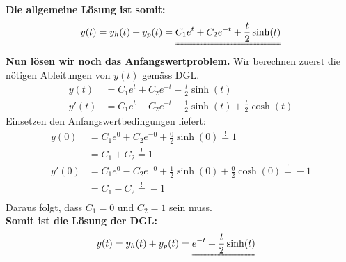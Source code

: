 \textbf{Die allgemeine Lösung ist somit:}
\[
	y(t) = y_h(t) + y_p(t) = \uuline{C_1 e^t + C_2 e^{-t} + \frac{t}{2} \sinh(t)}
\]
\textbf{Nun lösen wir noch das Anfangswertproblem.} Wir berechnen zuerst die nötigen Ableitungen von $y(t)$ gemäss DGL. 
\begin{align*}
	y(t) &= C_1 e^t + C_2 e^{-t} + \frac{t}{2} \sinh(t) \\
	y'(t) &= C_1 e^t - C_2 e^{-t} + \frac{1}{2} \sinh(t) + \frac{t}{2} \cosh(t) 
\end{align*}
Einsetzen den Anfangswertbedingungen liefert:
\begin{align*}
	y(0) &= C_1 e^0 + C_2 e^{-0} + \frac{0}{2} \sinh(0) \overset{!}{=} 1 \\
		 &= C_1 + C_2 \overset{!}{=} 1 \\
	y'(0) &= C_1 e^0 - C_2 e^{-0} + \frac{1}{2} \sinh(0) + \frac{0}{2} \cosh(0)  \overset{!}{=} -1 \\
		  &= C_1 - C_2 \overset{!}{=} -1 \\
\end{align*}
Daraus folgt, dass $C_1 = 0$ und $C_2 = 1$ sein muss. \\
\textbf{Somit ist die Lösung der DGL:}
\begin{align*}
	y(t) &= y_h(t) + y_p(t) = \uuline{e^{-t} + \frac{t}{2} \sinh(t)}
\end{align*}